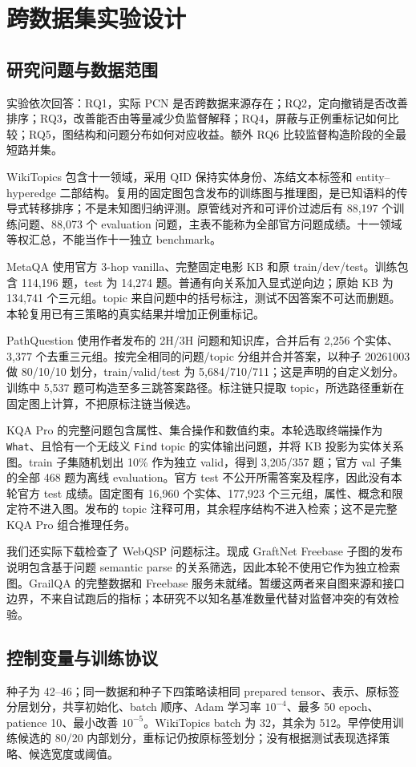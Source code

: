 \documentclass[UTF8,a4paper,10pt,fontset=fandol]{ctexart}
\begin{document}
\section{跨数据集实验设计}
\subsection{研究问题与数据范围}
实验依次回答：RQ1，实际 PCN 是否跨数据来源存在；RQ2，定向撤销是否改善排序；RQ3，改善能否由等量减少负监督解释；RQ4，屏蔽与正例重标记如何比较；RQ5，图结构和问题分布如何对应收益。额外 RQ6 比较监督构造阶段的全最短路并集。

WikiTopics 包含十一领域，采用 QID 保持实体身份、冻结文本标签和 entity--hyperedge 二部结构\cite{hyperrag}。复用的固定图包含发布的训练图与推理图，是已知语料的传导式转移排序；不是未知图归纳评测。原管线对齐和可评价过滤后有 88,197 个训练问题、88,073 个 evaluation 问题，主表不能称为全部官方问题成绩。十一领域等权汇总，不能当作十一独立 benchmark。

MetaQA 使用官方 3-hop vanilla、完整固定电影 KB 和原 train/dev/test\cite{metaqa}。训练包含 114,196 题，test 为 14,274 题。普通有向关系加入显式逆向边；原始 KB 为 134,741 个三元组。topic 来自问题中的括号标注，测试不因答案不可达而删题。本轮复用已有三策略的真实结果并增加正例重标记。

PathQuestion 使用作者发布的 2H/3H 问题和知识库\cite{pq}，合并后有 2,256 个实体、3,377 个去重三元组。按完全相同的问题/topic 分组并合并答案，以种子 20261003 做 80/10/10 划分，train/valid/test 为 5,684/710/711；这是声明的自定义划分。训练中 5,537 题可构造至多三跳答案路径。标注链只提取 topic，所选路径重新在固定图上计算，不把原标注链当候选。

KQA Pro 的完整问题包含属性、集合操作和数值约束\cite{kqa}。本轮选取终端操作为 \texttt{What}、且恰有一个无歧义 \texttt{Find} topic 的实体输出问题，并将 KB 投影为实体关系图。train 子集随机划出 10\% 作为独立 valid，得到 3,205/357 题；官方 val 子集的全部 468 题为离线 evaluation。官方 test 不公开所需答案及程序，因此没有本轮官方 test 成绩。固定图有 16,960 个实体、177,923 个三元组，属性、概念和限定符不进入图。发布的 topic 注释可用，其余程序结构不进入检索；这不是完整 KQA Pro 组合推理任务。

我们还实际下载检查了 WebQSP 问题标注。现成 GraftNet Freebase 子图的发布说明包含基于问题 semantic parse 的关系筛选，因此本轮不使用它作为独立检索图。GrailQA 的完整数据和 Freebase 服务未就绪。暂缓这两者来自图来源和接口边界，不来自试跑后的指标；本研究不以知名基准数量代替对监督冲突的有效检验。

\subsection{控制变量与训练协议}
种子为 42--46；同一数据和种子下四策略读相同 prepared tensor、表示、原标签分层划分，共享初始化、batch 顺序、Adam 学习率 $10^{-4}$、最多 50 epoch、patience 10、最小改善 $10^{-5}$。WikiTopics batch 为 32，其余为 512。早停使用训练候选的 80/20 内部划分，重标记仍按原标签划分；没有根据测试表现选择策略、候选宽度或阈值。
\end{document}
